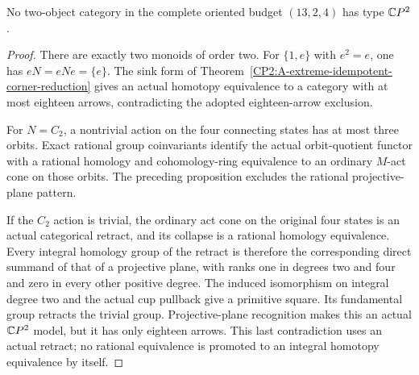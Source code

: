 \begin{corollary}
\label{CP2:A-oriented-nineteen-thirteen-two-four}
No two-object category in the complete oriented budget
$(13,2,4)$ has type $\mathbb{C}P^2$.
\end{corollary}
\begin{proof}
There are exactly two monoids of order two. For
$\{1,e\}$ with $e^2=e$, one has $eN=eNe=\{e\}$.
The sink form of
Theorem~\ref{CP2:A-extreme-idempotent-corner-reduction}
gives an actual homotopy equivalence to a category with
at most eighteen arrows, contradicting the adopted
eighteen-arrow exclusion.

For $N=C_2$, a nontrivial action on the four connecting
states has at most three orbits. Exact rational group
coinvariants identify the actual orbit-quotient functor
with a rational homology and cohomology-ring equivalence
to an ordinary $M$-act cone on those orbits. The preceding
proposition excludes the rational projective-plane pattern.

If the $C_2$ action is trivial, the ordinary act cone
on the original four states is an actual categorical
retract, and its collapse is a rational homology
equivalence. Every integral homology group of the retract
is therefore the corresponding direct summand of that
of a projective plane, with ranks one in degrees two
and four and zero in every other positive degree.
The induced isomorphism on integral degree two and the
actual cup pullback give a primitive square. Its
fundamental group retracts the trivial group. Projective-plane
recognition makes this an actual $\mathbb{C}P^2$ model, but it
has only eighteen arrows. This last contradiction uses
an actual retract; no rational equivalence is promoted
to an integral homotopy equivalence by itself.
\end{proof}
